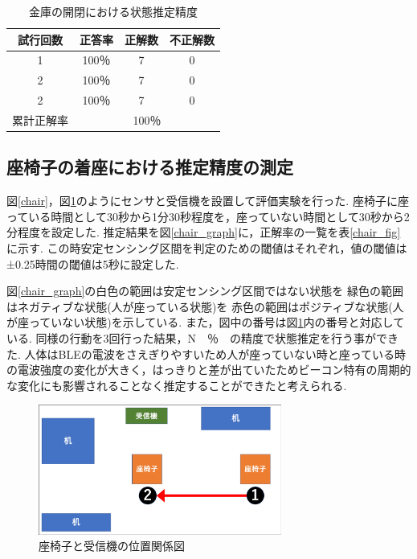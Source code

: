 \documentclass[Japanese]{dicomopapers}
\begin{document}
\begin{table}[htb]
    \begin{center}
        \caption{金庫の開閉における状態推定精度}
        \label{kinko_fig}
        \begin{tabular}{|c|c|c|c|} \hline
        試行回数 & 正答率 & 正解数 & 不正解数 \\ \hline
        1 & 100％ & 7 & 0 \\ \hline
        2 & 100％ & 7 & 0 \\ \hline
        2 & 100％ & 7 & 0 \\ \hline \hline
        累計正解率 & \multicolumn{3}{c|}{100％} \\ \hline
        \end{tabular}
    \end{center}
\end{table}



\subsection{座椅子の着座における推定精度の測定}

図\ref{chair}，図\ref{zaisu_position}のようにセンサと受信機を設置して評価実験を行った.
座椅子に座っている時間として30秒から1分30秒程度を，座っていない時間として30秒から2分程度を設定した.
推定結果を図\ref{chair_graph}に，正解率の一覧を表\ref{chair_fig}に示す.
この時安定センシング区間を判定のための閾値はそれぞれ，値の閾値は±0.25時間の閾値は5秒に設定した.

図\ref{chair_graph}の白色の範囲は安定センシング区間ではない状態を 緑色の範囲はネガティブな状態(人が座っている状態)を 赤色の範囲はポジティブな状態(人が座っていない状態)を示している.
また，図中の番号は図\ref{zaisu_position}内の番号と対応している.
同様の行動を3回行った結果，N　％　の精度で状態推定を行う事ができた.
人体はBLEの電波をさえぎりやすいため人が座っていない時と座っている時の電波強度の変化が大きく，はっきりと差が出ていたためビーコン特有の周期的な変化にも影響されることなく推定することができたと考えられる.



\begin{figure}[ht]
    \centering
    \includegraphics[width=8cm]{zaisu_position.png}
    \caption{座椅子と受信機の位置関係図}
    \label{zaisu_position}
\end{figure}
\end{document}
